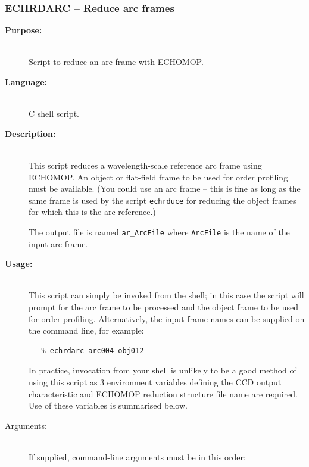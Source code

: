 \documentclass[twoside,11pt]{article}
\newcommand{\stardocinitials}  {SC}
\newcommand{\stardocnumber}    {3.2-0} %
\newcommand{\stardocname}{\stardocinitials /\stardocnumber}
\newcommand{\htmlref}[2]{#1}
\newcommand{\xref}[3]{#1}
\newcommand{\xlabel}[1]{}
\newcommand{\scspec}[2]{#1}
\newcommand{\scspec}[2]{#2}
\begin{document}
\newpage
\subsubsection{\label{se_echrdarc}\xlabel{echrdarc}ECHRDARC
                \scspec{--}{-} Reduce arc frames}
\markboth{ECHRDARC}{\stardocname}

\begin{description}

\item [{\bf Purpose:}] \mbox{} \\
     Script to reduce an arc frame with \xref{ECHOMOP}{sun152}{}.

\item [{\bf Language:}] \mbox{} \\
     C shell script.

\item [{\bf Description:}] \mbox{} \\
     This script reduces a wavelength-scale reference arc frame using
     ECHOMOP.  An object or flat-field frame to be used for order
     profiling must be available.  (You could use an arc frame
     \scspec{--}{-} this is fine as long as the same frame is
     used by the script \htmlref{\texttt{echrduce}}{se_echrduce}
     for reducing the object frames for which this is the arc
     reference.)

     The output file is named \verb+ar_ArcFile+ where \verb+ArcFile+ is
     the name of the input arc frame.

\item [{\bf Usage:}] \mbox{} \\
     This script can simply be invoked from the shell; in this case
     the script will prompt for the arc frame to be processed and the
     object frame to be used for order profiling.
     Alternatively, the input frame names can be supplied on the
     command line, for example:

\begin{verbatim}
   % echrdarc arc004 obj012
\end{verbatim}

     In practice, invocation from your shell is unlikely to be a good
     method of using this script as 3 environment variables defining
     the CCD output characteristic and ECHOMOP reduction structure file
     name are required.  Use of these variables is summarised below.

\item [Arguments:] \mbox{} \\
     If supplied, command-line arguments must be in this order:


\end{description}
\end{document}
